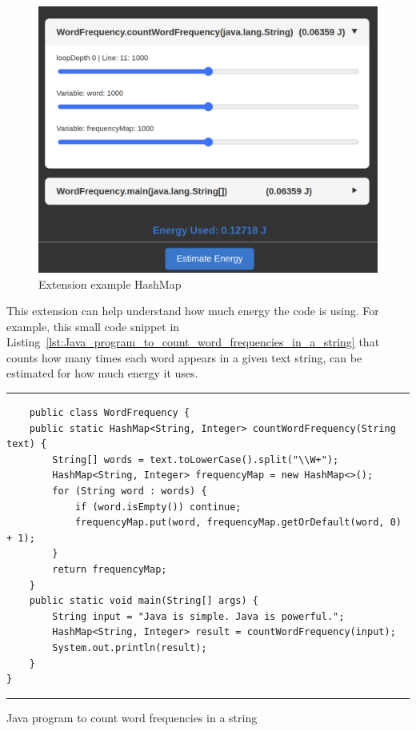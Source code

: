 \begin{figure}[htbp]
  \centering
  \includegraphics[width = .8 \textwidth]{figures/extension_example1.png}
  \caption{Extension example HashMap}
  \label{fig:extension_example1}
\end{figure}

This extension can help understand how much energy the code is using.
For example, this small code snippet in Listing~\ref{lst:Java_program_to_count_word_frequencies_in_a_string} that counts how many times each word appears in a given text string, can be estimated for how much energy it uses.

\begin{listing}[htbp]
\noindent\rule{\linewidth}{0.4pt}
\begin{verbatim}
    public class WordFrequency {
    public static HashMap<String, Integer> countWordFrequency(String text) {
        String[] words = text.toLowerCase().split("\\W+");
        HashMap<String, Integer> frequencyMap = new HashMap<>();
        for (String word : words) {
            if (word.isEmpty()) continue; 
            frequencyMap.put(word, frequencyMap.getOrDefault(word, 0) + 1);
        }
        return frequencyMap;
    }
    public static void main(String[] args) {
        String input = "Java is simple. Java is powerful.";
        HashMap<String, Integer> result = countWordFrequency(input);
        System.out.println(result);
    }
}
\end{verbatim}
\noindent\rule{\linewidth}{0.4pt}
\caption{Java program to count word frequencies in a string}            
\label{lst:Java_program_to_count_word_frequencies_in_a_string}
\end{listing}

